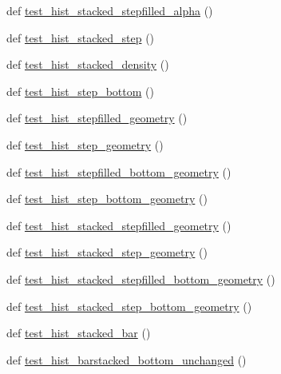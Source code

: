 \begin{DoxyCompactItemize}
\item 
def \hyperlink{namespacematplotlib_1_1tests_1_1test__axes_a72cf709ae68c295982ed955012f71048}{test\+\_\+hist\+\_\+stacked\+\_\+stepfilled\+\_\+alpha} ()
\item 
def \hyperlink{namespacematplotlib_1_1tests_1_1test__axes_af4fce3f486849d566ea53c8eb6557491}{test\+\_\+hist\+\_\+stacked\+\_\+step} ()
\item 
def \hyperlink{namespacematplotlib_1_1tests_1_1test__axes_a285bc6e56639ff720d0791c77619a58f}{test\+\_\+hist\+\_\+stacked\+\_\+density} ()
\item 
def \hyperlink{namespacematplotlib_1_1tests_1_1test__axes_a3766dffea30344119bda0b7805ace9d4}{test\+\_\+hist\+\_\+step\+\_\+bottom} ()
\item 
def \hyperlink{namespacematplotlib_1_1tests_1_1test__axes_a136b72e9c27160b8881fc1f90e733bc4}{test\+\_\+hist\+\_\+stepfilled\+\_\+geometry} ()
\item 
def \hyperlink{namespacematplotlib_1_1tests_1_1test__axes_ad5020417b6129d2c1321a0bfb889402f}{test\+\_\+hist\+\_\+step\+\_\+geometry} ()
\item 
def \hyperlink{namespacematplotlib_1_1tests_1_1test__axes_a0155f9f202bd7d1eca23e95559d5b696}{test\+\_\+hist\+\_\+stepfilled\+\_\+bottom\+\_\+geometry} ()
\item 
def \hyperlink{namespacematplotlib_1_1tests_1_1test__axes_a92e0ec0e36a8e50691386fd5ecf4b403}{test\+\_\+hist\+\_\+step\+\_\+bottom\+\_\+geometry} ()
\item 
def \hyperlink{namespacematplotlib_1_1tests_1_1test__axes_a14e9bf3ff5874bb880779d4b341cc2ae}{test\+\_\+hist\+\_\+stacked\+\_\+stepfilled\+\_\+geometry} ()
\item 
def \hyperlink{namespacematplotlib_1_1tests_1_1test__axes_a818b1c058ccb8b0adec9c70e22d3a2d5}{test\+\_\+hist\+\_\+stacked\+\_\+step\+\_\+geometry} ()
\item 
def \hyperlink{namespacematplotlib_1_1tests_1_1test__axes_a468b1073995ba3eb203f61b7d7fea957}{test\+\_\+hist\+\_\+stacked\+\_\+stepfilled\+\_\+bottom\+\_\+geometry} ()
\item 
def \hyperlink{namespacematplotlib_1_1tests_1_1test__axes_a8e6aeadc5936a7647f1f54693f0ac49d}{test\+\_\+hist\+\_\+stacked\+\_\+step\+\_\+bottom\+\_\+geometry} ()
\item 
def \hyperlink{namespacematplotlib_1_1tests_1_1test__axes_a87e2a99e3014dc65a099cb56bf22afb3}{test\+\_\+hist\+\_\+stacked\+\_\+bar} ()
\item 
def \hyperlink{namespacematplotlib_1_1tests_1_1test__axes_adc4f6640019b8bf2741791f2d5eba876}{test\+\_\+hist\+\_\+barstacked\+\_\+bottom\+\_\+unchanged} ()

\end{DoxyCompactItemize}
